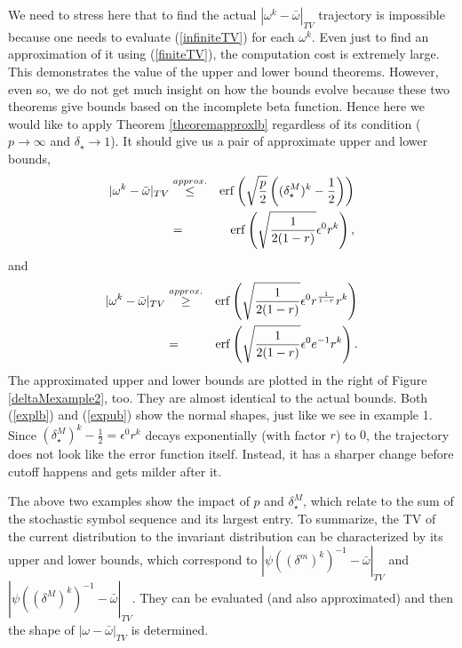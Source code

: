 \begin{example}
We need to stress here that to find the actual $|\omega^k-\bar{\omega}|_{TV}$ trajectory is impossible because one needs to evaluate (\ref{infiniteTV}) for each $\omega^k$. Even just to find an approximation of it using (\ref{finiteTV}), the computation cost is extremely large. This demonstrates the value of the upper and lower bound theorems. However, even so, we do not get much insight on how the bounds evolve because these two theorems give bounds based on the incomplete beta function. Hence here we would like to apply Theorem \ref{theoremapproxlb} regardless of its condition ($p \to \infty$ and $\delta_\star \to 1$). It should give us a pair of approximate upper and lower bounds,
\begin{eqnarray}
\label{expub}
|\omega^k -\bar{\omega}|_{TV}  &\stackrel{approx.}{\le}  &  \operatorname{erf}\left( \sqrt{\frac{p}{2}}\left((\delta_{\star}^M)^k-\frac{1}{2}\right)\right) \nonumber \\
                               & = &     \operatorname{erf}\left( \sqrt{\frac{1}{2(1-r)}} \epsilon^0r^k \right),
\end{eqnarray}
and
\begin{eqnarray}
\label{explb}
|\omega^k -\bar{\omega}|_{TV}  &\stackrel{approx.}{\ge} & \operatorname{erf}\left( \sqrt{\frac{1}{2(1-r)}} \epsilon^0 r^{\frac{1}{1-r}}r^k \right)  \nonumber \\
                               & = &  \operatorname{erf}\left( \sqrt{\frac{1}{2(1-r)}} \epsilon^0 e^{-1} r^k \right).
\end{eqnarray}
The approximated upper and lower bounds are plotted in the right of Figure \ref{deltaMexample2}, too. They are almost identical to the actual bounds.
Both (\ref{explb}) and (\ref{expub}) show the normal shapes, just like we see in example 1. Since
$(\delta_{\star}^M)^k-\frac{1}{2} = \epsilon^0 r^k$ decays exponentially (with factor $r$) to $0$, the trajectory
does not look like the error function itself. Instead, it has a sharper change before cutoff
happens and gets milder after it.
\end{example}

The above two examples show the impact of $p$ and $\delta_{\star}^M$, which relate to the sum of
the stochastic symbol sequence and its largest entry. To summarize, the TV of the current distribution to the invariant distribution can be characterized by its upper and lower bounds, which correspond to $|\psi( (\delta^m)^k )^{-1}-\bar{\omega}|_{TV}$ and $|\psi( (\delta^M)^k )^{-1}-\bar{\omega}|_{TV}$. They
can be evaluated (and also approximated) and then the shape of $|\omega-\bar{\omega}|_{TV}$ is determined.



